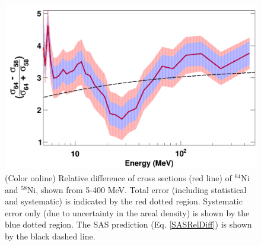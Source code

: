 \begin{figure}
    \includegraphics[scale=0.35]{figures/relativeDiff_Ni64Ni58.png}
    \caption{(Color online) Relative difference of cross sections (red line) of
        $^{\text{64}}$Ni and $^{\text{58}}$Ni, shown from 5-400
        MeV. Total error
        (including statistical and systematic) is indicated by the red
        dotted region. Systematic error only (due to uncertainty in the areal
        density) is shown by the blue dotted region. The SAS prediction (Eq.
        \ref{SASRelDiff}) is shown by the black dashed line.
    }
    \label{IsotopicDifferenceNi}
\end{figure}


